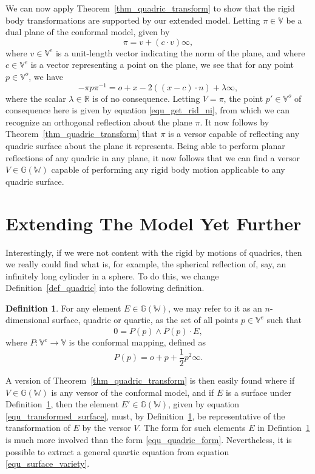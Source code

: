 \documentclass{birkjour}
\theoremstyle{definition}
\newtheorem{defn}[thm]{Definition}
\theoremstyle{remark}
\numberwithin{equation}{section}
\newcommand{\G}{\mathbb{G}}
\newcommand{\V}{\mathbb{V}}
\newcommand{\W}{\mathbb{W}}
\newcommand{\R}{\mathbb{R}}
\newcommand{\nvao}{o}
\newcommand{\nvai}{\infty}
\begin{document}
We can now apply Theorem~\ref{thm_quadric_transform} to show
that the rigid body transformations are supported by our extended model.
Letting $\pi\in\V$ be a dual plane of the conformal model, given by
\begin{equation}
\pi = v+(c\cdot v)\nvai,
\end{equation}
where $v\in\V^e$ is a unit-length vector indicating the norm of the plane,
and where $c\in\V^e$ is a vector representing a point on the plane,
we see that for any point $p\in\V^o$, we have
\begin{equation}
-\pi p\pi^{-1} = \nvao+x-2((x-c)\cdot n) + \lambda\nvai,
\end{equation}
where the scalar $\lambda\in\R$ is of no consequence.  Letting $V=\pi$,
the point $p'\in\V^o$ of consequence here is given by equation \eqref{equ_get_rid_ni},
from which we can recognize an orthogonal reflection about the plane $\pi$.
It now follows by Theorem~\ref{thm_quadric_transform} that $\pi$ is a versor
capable of reflecting any quadric surface about the plane it represents.
Being able to perform planar reflections of any quadric in any plane, it
now follows that we can find a versor $V\in\G(\W)$ capable of performing
any rigid body motion applicable to any quadric surface.

\section{Extending The Model Yet Further}

Interestingly, if we were not content with the rigid by motions of
quadrics, then we really could find what is, for example, the spherical
reflection of, say, an infinitely long cylinder in a sphere.  To do this, we change
Definition~\ref{def_quadric} into the following definition.
\begin{defn}\label{def_surface}
For any element $E\in\G(\W)$, we may refer to it as an $n$-dimensional
surface, quadric or quartic, as the set of all points $p\in\V^e$ such that
\begin{equation}\label{equ_surface_variety}
0 = P(p)\wedge\overline{P}(p)\cdot E,
\end{equation}
where $P:\V^e\to\V$ is the conformal mapping, defined as
\begin{equation}
P(p) = \nvao + p + \frac{1}{2}p^2\nvai.
\end{equation}
\end{defn}
A version of Theorem~\ref{thm_quadric_transform} is then easily found
where if $V\in\G(\W)$ is any versor of the conformal model, and if $E$
is a surface under Definition~\ref{def_surface}, then the element $E'\in\G(\W)$,
given by equation \eqref{equ_transformed_surface}, must, by Definition~\ref{def_surface},
 be representative of the transformation of $E$ by the versor $V$.  The form for
such elements $E$ in Defintion~\ref{def_surface} is much more involved than
the form \eqref{equ_quadric_form}.  Nevertheless, it is possible to extract
a general quartic equation from equation \eqref{equ_surface_variety}.
\end{document}
